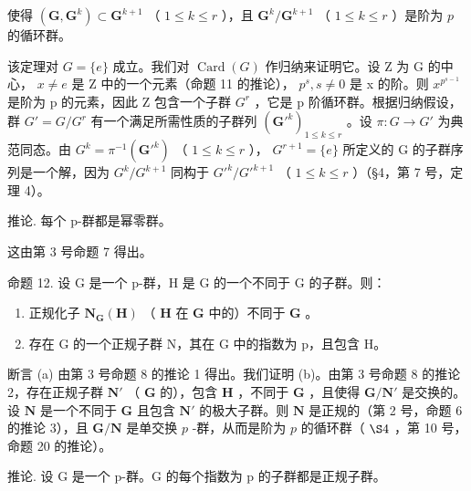 使得 \((\mathbf{G},\mathbf{G}^k)\subset \mathbf{G}^{k + 1}\) （ \(1\leqslant k\leqslant r\) ），且 \(\mathbf{G}^k /\mathbf{G}^{k + 1}\) （ \(1\leqslant k\leqslant r\) ）是阶为 \(p\) 的循环群。

该定理对 \(G = \{e\}\) 成立。我们对 \(\operatorname{Card}(G)\) 作归纳来证明它。设 Z 为 G 的中心， \(x \neq e\) 是 Z 中的一个元素（命题 11 的推论）， \(p^{s}, s \neq 0\) 是 x 的阶。则 \(x^{p^{s-1}}\) 是阶为 p 的元素，因此 Z 包含一个子群 \(G^{r}\) ，它是 p 阶循环群。根据归纳假设，群 \(G' = G/G^{r}\) 有一个满足所需性质的子群列 \((\mathbf{G}'^{k})_{1 \leqslant k \leqslant r}\) 。设 \(\pi: G \to G'\) 为典范同态。由 \(G^{k} = \pi^{-1}(\mathbf{G}'^{k})\) （ \(1 \leqslant k \leqslant r\) ）， \(G^{r+1} = \{e\}\) 所定义的 G 的子群序列是一个解，因为 \(G^{k}/G^{k+1}\) 同构于 \(G'^{k}/G'^{k+1}\) （ \(1 \leqslant k \leqslant r\) ）（§4，第 7 号，定理 4）。

推论. 每个 p-群都是幂零群。

这由第 3 号命题 7 得出。

命题 12. 设 G 是一个 p-群，H 是 G 的一个不同于 G 的子群。则：

\begin{enumerate}
\def\labelenumi{(\alph{enumi})}
\item
  正规化子 \(\mathbf{N}_{\mathbf{G}}(\mathbf{H})\) （ \(\mathbf{H}\) 在 \(\mathbf{G}\) 中的）不同于 \(\mathbf{G}\) 。
\item
  存在 G 的一个正规子群 N，其在 G 中的指数为 p，且包含 H。
\end{enumerate}

断言 (a) 由第 3 号命题 8 的推论 1 得出。我们证明 (b)。由第 3 号命题 8 的推论 2，存在正规子群 \(\mathbf{N}'\) （ \(\mathbf{G}\) 的），包含 \(\mathbf{H}\) ，不同于 \(\mathbf{G}\) ，且使得 \(\mathbf{G} / \mathbf{N}'\) 是交换的。设 \(\mathbf{N}\) 是一个不同于 \(\mathbf{G}\) 且包含 \(\mathbf{N}'\) 的极大子群。则 \(\mathbf{N}\) 是正规的（第 2 号，命题 6 的推论 3），且 \(\mathbf{G} / \mathbf{N}\) 是单交换 \(p\) -群，从而是阶为 \(p\) 的循环群（ \(\S 4\) ，第 10 号，命题 20 的推论）。

推论. 设 G 是一个 p-群。G 的每个指数为 p 的子群都是正规子群。

